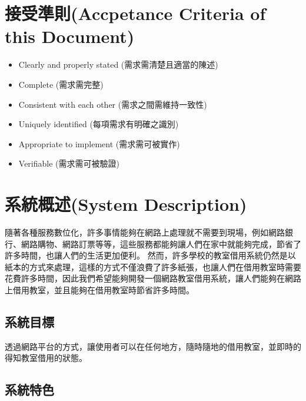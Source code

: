 \documentclass{article}
\begin{document}
\newpage

\begin{center}
	\tableofcontents
\end{center}

\newpage

\section[接受準則(ACCEPTANCE CRITERIA OF THIS DOCUMENT)]{接受準則(Accpetance Criteria of this Document)}


\begin{itemize}
	\color{blue}
	\item Clearly and properly stated (需求需清楚且適當的陳述)
	\item Complete (需求需完整)
	\item Consistent with each other (需求之間需維持一致性)
	\item Uniquely identified (每項需求有明確之識別)
	\item Appropriate to implement (需求需可被實作)
	\item Verifiable (需求需可被驗證)
\end{itemize}

\newpage

\section[系統概述(SYSTEM DESCRIPTION)]{系統概述(System Description)}

隨著各種服務數位化，許多事情能夠在網路上處理就不需要到現場，例如網路銀行、網路購物、網路訂票等等，這些服務都能夠讓人們在家中就能夠完成，節省了許多時間，也讓人們的生活更加便利。
然而，許多學校的教室借用系統仍然是以紙本的方式來處理，這樣的方式不僅浪費了許多紙張，也讓人們在借用教室時需要花費許多時間，因此我們希望能夠開發一個網路教室借用系統，讓人們能夠在網路上借用教室，並且能夠在借用教室時節省許多時間。

\subsection{系統目標}

透過網路平台的方式，讓使用者可以在任何地方，隨時隨地的借用教室，並即時的得知教室借用的狀態。

\subsection{系統特色}
\end{document}
